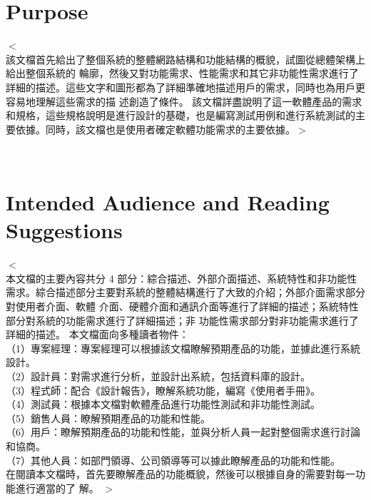 \documentclass{scrreprt}
\begin{document}
\begin{CJK}{UTF8}{bkai}
\section{Purpose}
$<$\\該文檔首先給出了整個系統的整體網路結構和功能結構的概貌，試圖從總體架構上給出整個系統的 輪廓，然後又對功能需求、性能需求和其它非功能性需求進行了詳細的描述。這些文字和圖形都為了詳細準確地描述用戶的需求，同時也為用戶更容易地理解這些需求的描 述創造了條件。 該文檔詳盡說明了這一軟體產品的需求和規格，這些規格說明是進行設計的基礎，也是編寫測試用例和進行系統測試的主要依據。同時，該文檔也是使用者確定軟體功能需求的主要依據。$>$

　　　%

\section{Intended Audience and Reading Suggestions}
$<$\\  本文檔的主要內容共分 4 部分：綜合描述、外部介面描述、系統特性和非功能性需求。綜合描述部分主要對系統的整體結構進行了大致的介紹；外部介面需求部分對使用者介面、軟體 介面、硬體介面和通訊介面等進行了詳細的描述；系統特性部分對系統的功能需求進行了詳細描述；非 功能性需求部分對非功能需求進行了詳細的描述。 本文檔面向多種讀者物件：\\ 
（1）專案經理：專案經理可以根據該文檔瞭解預期產品的功能，並據此進行系統設計。 \\
（2）設計員：對需求進行分析，並設計出系統，包括資料庫的設計。 \\
（3）程式師：配合《設計報告》，瞭解系統功能，編寫《使用者手冊》。 \\（4）測試員：根據本文檔對軟體產品進行功能性測試和非功能性測試。 \\（5）銷售人員：瞭解預期產品的功能和性能。 \\
（6）用戶：瞭解預期產品的功能和性能，並與分析人員一起對整個需求進行討論和協商。 \\
（7）其他人員：如部門領導、公司領導等可以據此瞭解產品的功能和性能。 \\
在閱讀本文檔時，首先要瞭解產品的功能概貌，然後可以根據自身的需要對每一功能進行適當的了 解。 
$>$


\end{CJK}
\end{document}
